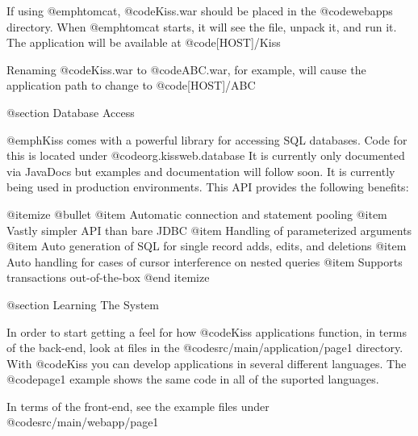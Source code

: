If using @emph{tomcat}, @code{Kiss.war} should be placed in the @code{webapps} directory.  When @emph{tomcat} starts, it will see the file, unpack it, and run it.  The application will be available at @code{[HOST]/Kiss}

Renaming @code{Kiss.war} to @code{ABC.war}, for example, will cause the application path to change to @code{[HOST]/ABC}

@section Database Access

@emph{Kiss} comes with a powerful library for accessing SQL databases.
Code for this is located under @code{org.kissweb.database} It is
currently only documented via JavaDocs but examples and documentation
will follow soon.  It is currently being used in production
environments.  This API provides the following benefits:

@itemize @bullet
@item
Automatic connection and statement pooling
@item
Vastly simpler API than bare JDBC
@item
Handling of parameterized arguments
@item 
Auto generation of SQL for single record adds, edits, and deletions
@item
Auto handling for cases of cursor interference on nested queries
@item
Supports transactions out-of-the-box
@end itemize


@section Learning The System

In order to start getting a feel for how @code{Kiss} applications
function, in terms of the back-end, look at files in the
@code{src/main/application/page1} directory.  With @code{Kiss} you can
develop applications in several different languages.  The @code{page1}
example shows the same code in all of the suported languages.

In terms of the front-end, see the example files under @code{src/main/webapp/page1}
